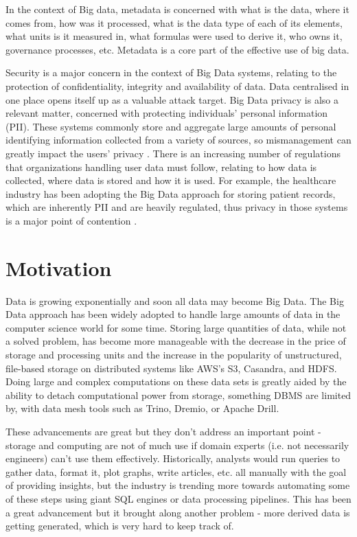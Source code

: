 In the context of Big data, metadata is concerned with what is the data, where it comes from, how was it processed, what is the data type of each of its elements, what units is it measured in, what formulas were used to derive it, who owns it, governance processes, etc. Metadata is a core part of the effective use of big data.

Security is a major concern in the context of Big Data systems, relating to the protection of confidentiality, integrity and availability of data. Data centralised in one place opens itself up as a valuable attack target. Big Data privacy is also a relevant matter, concerned with protecting individuals' personal information (PII). These systems commonly store and aggregate large amounts of personal identifying information collected from a variety of sources, so mismanagement can greatly impact the users' privacy \cite{bigDataSecurityTankard20125}. There is an increasing number of regulations that organizations handling user data must follow, relating to how data is collected, where data is stored and how it is used. For example, the healthcare industry has been adopting the Big Data approach for storing patient records, which are inherently PII and are heavily regulated, thus privacy in those systems is a major point of contention \cite{bigDataSecurityHealthPatil2014}.

\section{Motivation}

Data is growing exponentially and soon all data may become Big Data. The Big Data approach has been widely adopted to handle large amounts of data in the computer science world for some time. Storing large quantities of data, while not a solved problem, has become more manageable with the decrease in the price of storage and processing units and the increase in the popularity of unstructured, file-based storage on distributed systems like AWS’s S3, Casandra, and HDFS. Doing large and complex computations on these data sets is greatly aided by the ability to detach computational power from storage, something DBMS are limited by, with data mesh tools such as Trino, Dremio, or Apache Drill.

These advancements are great but they don’t address an important point - storage and computing are not of much use if domain experts (i.e. not necessarily engineers) can't use them effectively. Historically, analysts would run queries to gather data, format it, plot graphs, write articles, etc. all manually with the goal of providing insights, but the industry is trending more towards automating some of these steps using giant SQL engines or data processing pipelines. This has been a great advancement but it brought along another problem - more derived data is getting generated, which is very hard to keep track of.


